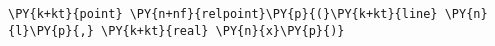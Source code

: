 \begin{Verbatim}[commandchars=\\\{\}]
    \PY{k+kt}{point} \PY{n+nf}{relpoint}\PY{p}{(}\PY{k+kt}{line} \PY{n}{l}\PY{p}{,} \PY{k+kt}{real} \PY{n}{x}\PY{p}{)}
\end{Verbatim}
